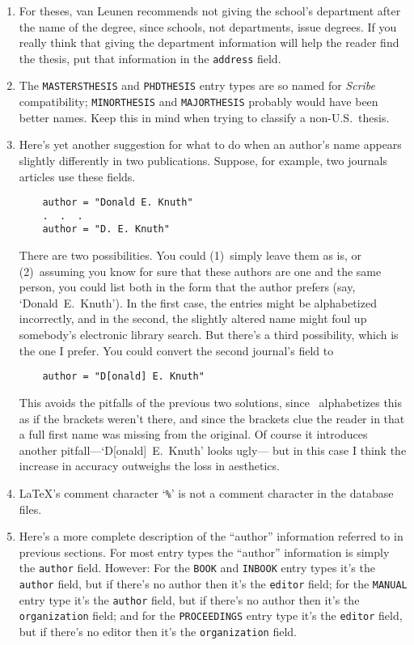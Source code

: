 \begin{enumerate}
\item
For theses, van Leunen recommends not giving
the school's department after the name of the degree,
since schools, not departments, issue degrees.
If you really think that giving the department information
will help the reader find the thesis,
put that information in the \hbox{\tt address} field.

\item
The \hbox{\tt MASTERSTHESIS} and \hbox{\tt PHDTHESIS} entry types
are so named for {\em Scribe\/} compatibility;
\hbox{\tt MINORTHESIS} and \hbox{\tt MAJORTHESIS}
probably would have been better names.
Keep this in mind when trying to classify
a non-U.S.\ thesis.

\item
Here's yet another suggestion for what to do when an author's
name appears slightly differently in two publications.
Suppose, for example, two journals articles use these fields.
\begin{verbatim}
    author = "Donald E. Knuth"
    .  .  .
    author = "D. E. Knuth"
\end{verbatim}
There are two possibilities.
You could (1)~simply leave them as is,
or (2)~assuming you know for sure that
these authors are one and the same person,
you could list both in the form that the author prefers
(say, `Donald~E.\ Knuth').
In the first case, the entries might be alphabetized incorrectly,
and in the second, the slightly altered name might
foul up somebody's electronic library search.
But there's a third possibility, which is the one I prefer.
You could convert the second journal's field to
\begin{verbatim}
    author = "D[onald] E. Knuth"
\end{verbatim}
This avoids the pitfalls of the previous two solutions,
since \BibTeX\ alphabetizes this as if the brackets weren't there,
and since the brackets clue the reader in that a full first name
was missing from the original.
Of course it introduces another pitfall---`D[onald]~E.\ Knuth' looks ugly---%
but in this case I think the increase in accuracy outweighs
the loss in aesthetics.

\item
\LaTeX's comment character `{\tt\%}' is not a comment character
in the database files.

\item
Here's a more complete description of
the ``author'' information referred to in previous sections.
For most entry types the ``author'' information
is simply the \hbox{\tt author} field.
However:
For the \hbox{\tt BOOK} and \hbox{\tt INBOOK} entry types
it's the \hbox{\tt author} field, but if there's no author
then it's the \hbox{\tt editor} field;
for the \hbox{\tt MANUAL} entry type
it's the \hbox{\tt author} field, but if there's no author
then it's the \hbox{\tt organization} field;
and for the \hbox{\tt PROCEEDINGS} entry type
it's the \hbox{\tt editor} field, but if there's no editor
then it's the \hbox{\tt organization} field.


\end{enumerate}

